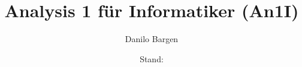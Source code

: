 



\subject{Hochschule für Technik Rapperswil}
\title{Analysis 1 für Informatiker (An1I)}
\author{Danilo Bargen}
\date{Stand: \revisiondate}














